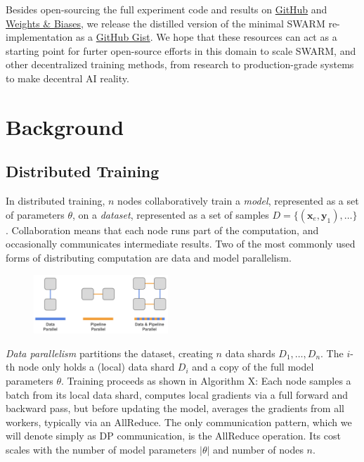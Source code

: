 \documentclass{article}
\begin{document}
Besides open-sourcing the full experiment code and results on
\href{https://github.com/mikasenghaas/swarm}{GitHub} and
\href{https://wandb.ai/mikasenghaas/swarm}{Weights \& Biases}, we release the
distilled version of the minimal SWARM re-implementation as a
\href{https://gist.github.com/mikasenghaas/5fa1aa77ea69f187f531a5889983c249}{GitHub
Gist}. We hope that these resources can act as a starting point for furter
open-source efforts in this domain to scale SWARM, and other decentralized
training methods, from research to production-grade systems to make decentral AI
reality.

\section{Background}

\subsection{Distributed Training}

In distributed training, $n$ nodes collaboratively train a \textit{model},
represented as a set of parameters $\theta$, on a \textit{dataset}, represented
as a set of samples $D = \{(\mathbf{x}_e, \mathbf{y}_1),\dots\}$. Collaboration 
means that each node runs part of the computation, and occasionally communicates
intermediate results. Two of the most commonly used forms of distributing
computation are data and model parallelism.

\begin{figure}[h]
    \centering
    \includegraphics[width=0.45\textwidth]{figures/parallelization.png}
    \caption{}
    \label{fig:parallelization}
\end{figure}

\textit{Data parallelism} partitions the dataset, creating $n$ data shards
$D_1,\dots,D_n$. The $i$-th node only holds a (local) data shard $D_i$ and a
copy of the full model parameters $\theta$. Training proceeds as shown in
Algorithm X: Each node samples a batch from its local data shard,
computes local gradients via a full forward and backward pass, but before
updating the model, averages the gradients from all workers, typically via an
AllReduce. The only communication pattern, which we will denote simply as DP
communication, is the AllReduce operation. Its cost scales with the number
of model parameters $|\theta|$ and number of nodes $n$.
\end{document}
